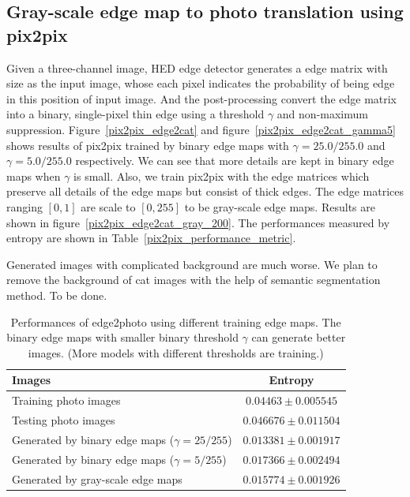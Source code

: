 \subsection{Gray-scale edge map to photo translation using pix2pix}
Given a three-channel image, HED edge detector generates a edge matrix with size as the input image, whose each pixel indicates the probability of being edge in this position of input image. And the post-processing convert the edge matrix into a binary, single-pixel thin edge using a threshold $\gamma$ and non-maximum suppression. Figure~\ref{pix2pix_edge2cat} and figure~\ref{pix2pix_edge2cat_gamma5} shows results of pix2pix trained by binary edge maps with $\gamma=25.0/255.0$ and $\gamma=5.0/255.0$ respectively. We can see that more details are kept in binary edge maps when $\gamma$ is small. 
Also, we train pix2pix with the edge matrices which preserve all details of the edge maps but consist of thick edges. The edge matrices ranging $[0,1]$ are scale to $[0,255]$ to be gray-scale edge maps. Results are shown in figure~\ref{pix2pix_edge2cat_gray_200}. The performances measured by entropy are shown in Table~\ref{pix2pix_performance_metric}.

Generated images with complicated background are much worse. We plan to remove the background of cat images with the help of semantic segmentation method. To be done.
\begin{table}[h]
    \centering
    \begin{tabular}{|l|c|}\hline
    	Images&Entropy\\\hline
    	Training photo images & $0.04463\pm 0.005545$ \\
    	Testing photo images & $0.046676\pm 0.011504$ \\
    	Generated by binary edge maps ($\gamma=25/255$)& $0.013381\pm 0.001917$\\
    	Generated by binary edge maps ($\gamma=5/255$)& $0.017366\pm 0.002494$\\
	    Generated by gray-scale edge maps & $ 0.015774\pm 0.001926$ \\\hline
    \end{tabular}
    \caption{Performances of edge2photo using different training edge maps. The binary edge maps with smaller binary threshold $\gamma$ can generate better images. (More models with different thresholds are training.)}
    \label{tab:pix2pix_performance_metric}
\end{table}
